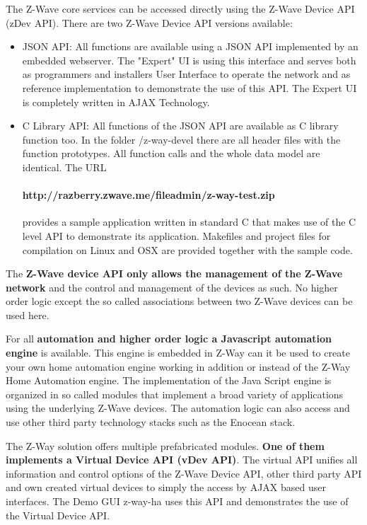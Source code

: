 The Z-Wave core services can be accessed directly using the Z-Wave Device API (zDev API). There are two
Z-Wave Device API versions available:
\begin{itemize}
\item JSON API: All functions are available using a JSON API implemented by an 
embedded webserver. The "Expert" UI is using this interface and serves both as programmers 
and installers User Interface to operate the network and as reference implementation to demonstrate the use of this 
API. The Expert UI is completely written in AJAX Technology.
\item C Library API: All functions of the JSON API are available as C library 
function too. In the folder /z-way-devel there are all header files with the function 
prototypes. All function calls and the whole data model are identical. The URL

\paragraph{http://razberry.zwave.me/fileadmin/z-way-test.zip}

provides a sample application written in standard C that makes use of the C level API to 
demonstrate its application. Makefiles and project files for compilation on Linux and 
OSX are provided together with the sample code.

\end{itemize}

The \textbf{Z-Wave device API only allows the management of the Z-Wave network} and the control
and management of the devices as such. No higher order logic except the so called associations
between two Z-Wave devices can be used here.

For all \textbf{automation and higher order logic a Javascript automation engine} is available.
This engine is embedded in Z-Way can it be used to create your own home automation engine
working in addition or instead  of the Z-Way Home Automation engine. 
The implementation of the Java Script engine is organized in so called modules that implement 
a broad variety of applications using the underlying Z-Wave devices. The automation logic 
can also access and use other third party technology stacks such as the Enocean stack.

The Z-Way solution offers multiple prefabricated modules. \textbf{One of them implements
a Virtual Device API (vDev API)}. The virtual API unifies all information and control options
of the Z-Wave Device API, other third party API and own created virtual devices to simply
the access by AJAX based user interfaces.
The Demo GUI z-way-ha uses this API and demonstrates the use of the Virtual Device API.



